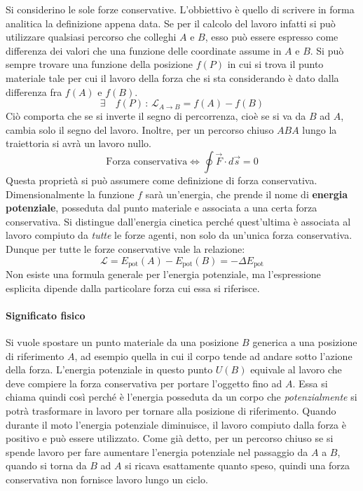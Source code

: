 \documentclass[10pt,a4paper]{book}
\begin{document}
Si considerino le sole forze conservative. L'obbiettivo è quello di scrivere in forma analitica la definizione appena data. Se per il calcolo del lavoro infatti si può utilizzare qualsiasi percorso che colleghi $A$ e $B$, esso può essere espresso come differenza dei valori che una funzione delle coordinate assume in $A$ e $B$. Si può sempre trovare una funzione della posizione $f(P)$ in cui si trova il punto materiale tale per cui il lavoro della forza che si sta considerando è dato dalla differenza fra $f(A)$ e $f(B)$.
\[
	\exists \quad f(P)\,: \, \mathcal{L}_{A \to B}= f(A)-f(B)
\]
Ciò comporta che se si inverte il segno di percorrenza, cioè se si va da $B$ ad $A$, cambia solo il segno del lavoro. Inoltre, per un percorso chiuso $ABA$ lungo la traiettoria si avrà un lavoro nullo.
\[
	\boxed{\text{Forza conservativa} \iff \oint \vec{F} \cdot d\vec{s} = 0}
\]
Questa proprietà si può assumere come definizione di forza conservativa.
Dimensionalmente la funzione $f$ sarà un'energia, che prende il nome di 	\textbf{energia potenziale}, posseduta dal punto materiale e associata a una certa forza conservativa. Si distingue dall'energia cinetica perché quest'ultima è associata al lavoro compiuto da \emph{tutte} le forze agenti, non solo da un'unica forza conservativa. Dunque per tutte le forze conservative vale la relazione:
\[
	\mathcal{L}=E_{\text{pot}}(A)-E_{\text{pot}}(B)=-\Delta E_{\text{pot}}
\]
Non esiste una formula generale per l'energia potenziale, ma l'espressione esplicita dipende dalla particolare forza cui essa si riferisce.

\paragraph{Significato fisico} Si vuole spostare un punto materiale da una posizione $B$ generica a una posizione di riferimento $A$, ad esempio quella in cui il corpo tende ad andare sotto l'azione della forza. L'energia potenziale in questo punto $U(B)$ equivale al lavoro che deve compiere la forza conservativa per portare l'oggetto fino ad $A$. Essa si chiama quindi così perché è l'energia posseduta da un corpo che \emph{potenzialmente} si potrà trasformare in lavoro per tornare alla posizione di riferimento. Quando durante il moto l'energia potenziale diminuisce, il lavoro compiuto dalla forza è positivo e può essere utilizzato. Come già detto, per un percorso chiuso se si spende lavoro per fare aumentare l'energia potenziale nel passaggio da $A$ a $B$, quando si torna da $B$ ad $A$ si ricava esattamente quanto speso, quindi una forza conservativa non fornisce lavoro lungo un ciclo.
\end{document}
